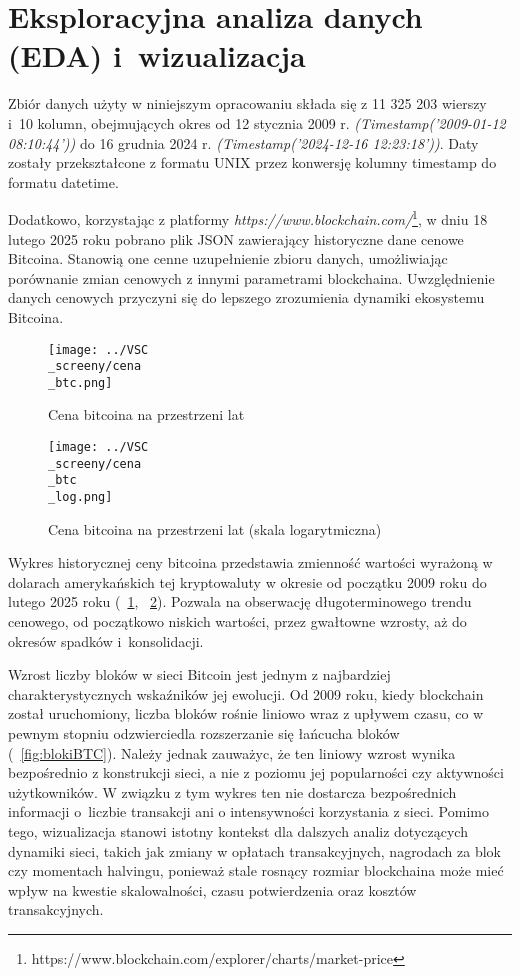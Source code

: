 \documentclass[12pt,a4paper]{report}
\theoremstyle{definition} %
\begin{document}
	\section{Eksploracyjna analiza danych (EDA) i~wizualizacja}
	\hspace*{\parindent}Zbiór danych użyty w niniejszym opracowaniu składa się z 11 325 203 wierszy i~10 kolumn, obejmujących okres od 12 stycznia 2009 r. \textit{(Timestamp('2009-01-12 08:10:44'))} do 16 grudnia 2024 r. \textit{(Timestamp('2024-12-16 12:23:18'))}. Daty zostały przekształcone z formatu UNIX przez konwersję kolumny timestamp do formatu datetime.

	Dodatkowo, korzystając z platformy \textit{https://www.blockchain.com/}\footnote{https://www.blockchain.com/explorer/charts/market-price}, w dniu 18 lutego 2025 roku pobrano plik JSON zawierający historyczne dane cenowe Bitcoina. Stanowią one cenne uzupełnienie zbioru danych, umożliwiając porównanie zmian cenowych z innymi parametrami 			blockchaina. Uwzględnienie danych cenowych przyczyni się do lepszego zrozumienia dynamiki ekosystemu Bitcoina.

	\begin{figure}[H]
	    \centering
	    \texttt{[image: ../VSC\\\_screeny/cena\\\_btc.png]} 
	    \caption{Cena bitcoina na przestrzeni lat}
	    \label{fig:cenaBTC}
	\end{figure}

	\begin{figure}[H]
	    \centering
	    \texttt{[image: ../VSC\\\_screeny/cena\\\_btc\\\_log.png]} 
	    \caption{Cena bitcoina na przestrzeni lat (skala logarytmiczna)}
	    \label{fig:cenaBTClog}
	\end{figure}

	Wykres historycznej ceny bitcoina przedstawia zmienność wartości wyrażoną w dolarach amerykańskich tej kryptowaluty w okresie od początku 2009 roku do lutego 2025 roku (\figurename~\ref{fig:cenaBTC}, \figurename~\ref{fig:cenaBTClog}). Pozwala na obserwację długoterminowego trendu cenowego, od początkowo niskich wartości, przez gwałtowne wzrosty, aż do okresów spadków i~konsolidacji.

Wzrost liczby bloków w sieci Bitcoin jest jednym z najbardziej charakterystycznych wskaźników jej ewolucji. Od 2009 roku, kiedy blockchain został uruchomiony, liczba bloków rośnie liniowo wraz z upływem czasu, co w pewnym stopniu odzwierciedla rozszerzanie się łańcucha bloków (\figurename~\ref{fig:blokiBTC}). Należy jednak zauważyc, że ten liniowy wzrost wynika bezpośrednio z konstrukcji sieci, a nie z poziomu jej popularności czy aktywności użytkowników. W związku z tym wykres ten nie dostarcza bezpośrednich informacji o~liczbie transakcji ani o intensywności korzystania z sieci. Pomimo tego, wizualizacja stanowi istotny kontekst dla dalszych analiz dotyczących dynamiki sieci, takich jak zmiany w opłatach transakcyjnych, nagrodach za blok czy momentach halvingu, ponieważ stale rosnący rozmiar blockchaina może mieć wpływ na kwestie skalowalności, czasu potwierdzenia oraz kosztów transakcyjnych.
\end{document}
